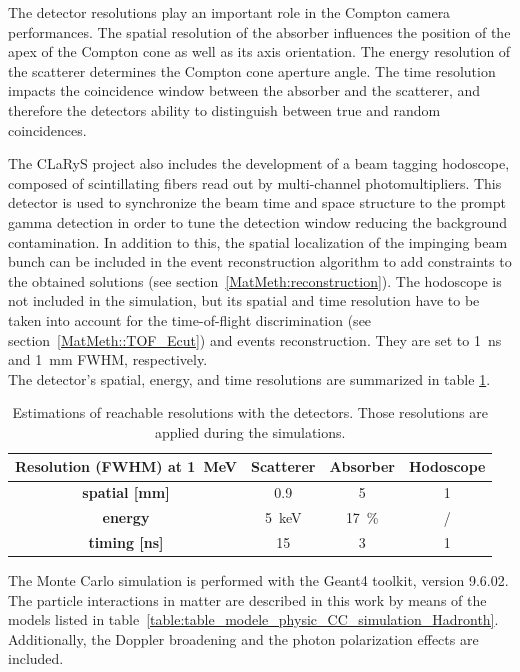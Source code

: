 The detector resolutions play an important role in the Compton camera performances. The spatial resolution of the absorber influences the position of the apex of the Compton cone as well as its axis orientation. The energy resolution of the scatterer determines the Compton cone aperture angle. The time resolution impacts the coincidence window between the absorber and the scatterer, and therefore the detectors ability to distinguish between true and random coincidences.

The CLaRyS project also includes the development of a beam tagging hodoscope, composed of scintillating fibers read out by multi-channel photomultipliers. This detector is used to synchronize the beam time and space structure to the prompt gamma detection in order to tune the detection window reducing the background contamination. In addition to this, the spatial localization of the impinging beam bunch can be included in the event reconstruction algorithm to add constraints to the obtained solutions (see section~\ref{MatMeth:reconstruction}). The hodoscope is not included in the simulation, but its spatial and time resolution have to be taken into account for the time-of-flight discrimination (see section~\ref{MatMeth::TOF_Ecut}) and events reconstruction. They are set to 1~ns and 1~mm FWHM, respectively.\\ 
The detector's spatial, energy, and time resolutions are summarized in table \ref{table:table_resolution_detecteurs_CC_simulation_Hadronth}.

\begin{table}
\centering
\caption{Estimations of reachable resolutions with the detectors. Those resolutions are applied during the simulations.}
\begin{tabular}{cccc}
\hline
\textbf{Resolution (FWHM) at 1~MeV} & \textbf{Scatterer} & \textbf{Absorber} & \textbf{Hodoscope}\\
\hline 
\textbf{spatial [mm]	}			 &     0.9		 &  5 &	 1\\
\textbf{energy}				&	5~keV		&  17~\%	&	/\\
\textbf{timing [ns]}	        		&	15			&	3 	&  1\\
\hline
\end{tabular}
\label{table:table_resolution_detecteurs_CC_simulation_Hadronth}
\end{table}
    
The Monte Carlo simulation is performed with the Geant4 toolkit, version 9.6.02. 
The particle interactions in matter are described in this work by means of the models listed in table~\ref{table:table_modele_physic_CC_simulation_Hadronth}. Additionally, the Doppler broadening and the photon polarization effects are included.
 

